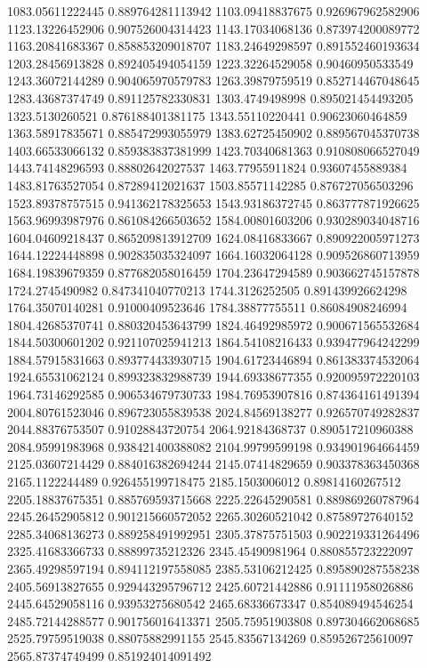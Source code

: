 {1083.05611222445 0.889764281113942
1103.09418837675 0.926967962582906
1123.13226452906 0.907526004314423
1143.17034068136 0.873974200089772
1163.20841683367 0.858853209018707
1183.24649298597 0.891552460193634
1203.28456913828 0.892405494054159
1223.32264529058 0.90460950533549
1243.36072144289 0.904065970579783
1263.39879759519 0.852714467048645
1283.43687374749 0.891125782330831
1303.4749498998 0.895021454493205
1323.5130260521 0.876188401381175
1343.55110220441 0.90623060464859
1363.58917835671 0.885472993055979
1383.62725450902 0.889567045370738
1403.66533066132 0.859383837381999
1423.70340681363 0.910808066527049
1443.74148296593 0.88802642027537
1463.77955911824 0.93607455889384
1483.81763527054 0.87289412021637
1503.85571142285 0.876727056503296
1523.89378757515 0.941362178325653
1543.93186372745 0.863777871926625
1563.96993987976 0.861084266503652
1584.00801603206 0.930289034048716
1604.04609218437 0.865209813912709
1624.08416833667 0.890922005971273
1644.12224448898 0.902835035324097
1664.16032064128 0.909526860713959
1684.19839679359 0.877682058016459
1704.23647294589 0.903662745157878
1724.2745490982 0.847341040770213
1744.3126252505 0.891439926624298
1764.35070140281 0.91000409523646
1784.38877755511 0.86084908246994
1804.42685370741 0.880320453643799
1824.46492985972 0.900671565532684
1844.50300601202 0.921107025941213
1864.54108216433 0.939477964242299
1884.57915831663 0.893774433930715
1904.61723446894 0.861383374532064
1924.65531062124 0.899323832988739
1944.69338677355 0.920095972220103
1964.73146292585 0.906534679730733
1984.76953907816 0.874364161491394
2004.80761523046 0.896723055839538
2024.84569138277 0.926570749282837
2044.88376753507 0.91028843720754
2064.92184368737 0.890517210960388
2084.95991983968 0.938421400388082
2104.99799599198 0.934901964664459
2125.03607214429 0.884016382694244
2145.07414829659 0.903378363450368
2165.1122244489 0.926455199718475
2185.1503006012 0.89814160267512
2205.18837675351 0.885769593715668
2225.22645290581 0.889869260787964
2245.26452905812 0.901215660572052
2265.30260521042 0.87589727640152
2285.34068136273 0.889258491992951
2305.37875751503 0.902219331264496
2325.41683366733 0.88899735212326
2345.45490981964 0.880855723222097
2365.49298597194 0.894112197558085
2385.53106212425 0.895890287558238
2405.56913827655 0.929443295796712
2425.60721442886 0.91111958026886
2445.64529058116 0.93953275680542
2465.68336673347 0.854089494546254
2485.72144288577 0.901756016413371
2505.75951903808 0.897304662068685
2525.79759519038 0.88075882991155
2545.83567134269 0.859526725610097
2565.87374749499 0.851924014091492
}

